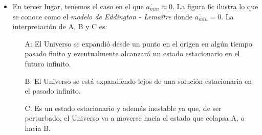 \documentclass[11pt]{article}
\begin{document}
{\begin{itemize}
\begin{itemize}
                \item [Rama B:] En este caso, el Universo nunca se expandió alcanzando valores suficientemente grades del factor de escala $a$ como para que la fuerza repulsiva transportada a través de $\Lambda$ pudiera evitar el colapso del Universo. No presenta una singularidad inicial, por lo que el Universo ``rebotó''  bajo la influencia de la fuerza repulsiva. 
            \end{itemize}
            
            En el caso límite, en el que el parámetro de densidad $\Omega_0 = 0$ la dinámica del modelo y su solución vienen dadas por
            
            \begin{align}
                \dot{a}^2 & = H_0^2 [\Omega_{\Lambda} a^2 - (\Omega_{\Lambda}-1)], \\
                a & = \left(\frac{\Omega_{\Lambda} - 1}{\Omega_{\Lambda}} \right)^{1/2} \cosh \Omega_{\Lambda}^{1/2} H_0 \tau.
            \end{align}
            
            De esta última relación, $\tau = t - t_{min}$, el cual es medido desde el momento en el que el Universo `rebotó', i.e., cuando $a= a_{min}$. El comportamiento asintótico que presenta es debido al colapso exponencial que experimenta y son soluciones exponenciales de Sitter
            
            \begin{equation}
                a = \left(\frac{\Omega_{\Lambda} - 1}{\Omega_{\Lambda}} \right)^{1/2} \exp (\pm \Omega_{\Lambda}^{1/2} H_0 \tau).
            \end{equation}
            
            En estos Universos `rebotantes', el valor más pequeño de $a$, $a_{min}$, es aquel con el desplazamieto al rojo más grade que un objeto pueda tener. 
       
       \item En tercer lugar, tenemos el caso en el que $\dot{a_{min}} \approx 0$. La figura 6c ilustra lo que se conoce como el {\textit{modelo de Eddington - Lema\^itre}} donde $\dot{a_{min}} = 0$. La interpretación de A, B y C es:
       
       \begin{itemize}
           \item[A:] El Universo se expandió desde un punto en el origen en algún tiempo pasado finito y eventualmente alcanzará un estado estacionario en el futuro infinito. 
           \item[B:] El Universo se está expandiendo lejos de una solución estacionaria en el pasado infinito. 
           \item[C:] Es un estado estacionario y además inestable ya que, de ser perturbado, el Universo va a moverse hacia el estado que colapsa A, o hacia B. 
           

\end{itemize}
\end{itemize}}
\end{document}
